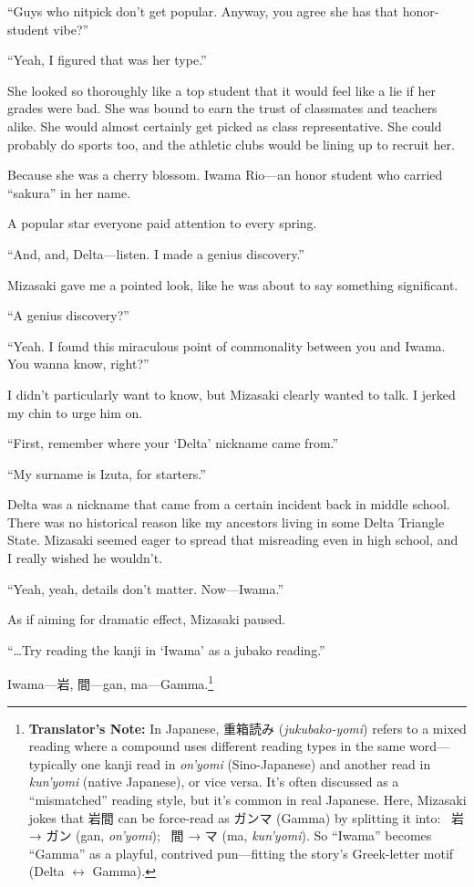 \documentclass[
    a4paper,
    12pt,
    twoside,
    openany,
    UTF8,
    fontset=windows
]{ctexbook}
\begin{document}
``Guys who nitpick don't get popular. Anyway, you agree she has that honor-student vibe?''

``Yeah, I figured that was her type.''

She looked so thoroughly like a top student that it would feel like a lie if her grades were bad. She was bound to earn the trust of classmates and teachers alike. She would almost certainly get picked as class representative. She could probably do sports too, and the athletic clubs would be lining up to recruit her.

Because she was a cherry blossom. Iwama Rio---an honor student who carried ``sakura'' in her name.

A popular star everyone paid attention to every spring.

``And, and, Delta---listen. I made a genius discovery.''

Mizasaki gave me a pointed look, like he was about to say something significant.

``A genius discovery?''

``Yeah. I found this miraculous point of commonality between you and Iwama. You wanna know, right?''

I didn't particularly want to know, but Mizasaki clearly wanted to talk. I jerked my chin to urge him on.

``First, remember where your `Delta' nickname came from.''

``My surname is Izuta, for starters.''

Delta was a nickname that came from a certain incident back in middle school. There was no historical reason like my ancestors living in some Delta Triangle State. Mizasaki seemed eager to spread that misreading even in high school, and I really wished he wouldn't.

``Yeah, yeah, details don't matter. Now---Iwama.''

As if aiming for dramatic effect, Mizasaki paused.

``\dots Try reading the kanji in `Iwama' as a jubako reading.''

Iwama---岩, 間---gan, ma---Gamma.\footnote{\textbf{Translator's Note:} In Japanese, 重箱読み (\textit{jukubako-yomi}) refers to a mixed reading where a compound uses different reading types in the same word---typically one kanji read in \textit{on'yomi} (Sino-Japanese) and another read in \textit{kun'yomi} (native Japanese), or vice versa. It's often discussed as a ``mismatched'' reading style, but it's common in real Japanese. Here, Mizasaki jokes that 岩間 can be force-read as ガンマ (Gamma) by splitting it into: \textbullet\ 岩 → ガン (gan, \textit{on'yomi}); \textbullet\ 間 → マ (ma, \textit{kun'yomi}). So ``Iwama'' becomes ``Gamma'' as a playful, contrived pun---fitting the story's Greek-letter motif (Delta $\leftrightarrow$ Gamma).}
\end{document}
